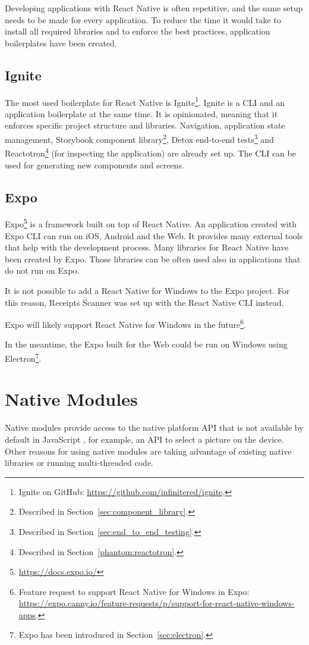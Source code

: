 \documentclass[
  digital, %
  table,   %
  oneside, %
  lof,     %
  lot,     %
]{fithesis3}
\begin{document}
Developing applications with React Native is often repetitive, and the same setup needs to be made for every application. To reduce the time it would take to install all required libraries and to enforce the best practices, application boilerplates have been created.

\subsection{Ignite}
The most used boilerplate for React Native is Ignite\footnote{Ignite on GitHub: \url{https://github.com/infinitered/ignite}.}.
Ignite is a CLI and an application boilerplate at the same time. It is opinionated, meaning that it enforces specific project structure and libraries. Navigation, application state management, Storybook component library\footnote{Described in Section~\ref{sec:component_library}.}, Detox end-to-end tests\footnote{Described in Section~\ref{sec:end_to_end_testing}.} and Reactotron\footnote{Described in Section~\ref{phantom:reactotron}.} (for inspecting the application) are already set up. The CLI can be used for generating new components and screens.

\subsection{Expo}
\label{sec:expo}
Expo\footnote{\url{https://docs.expo.io/}} is a framework built on top of React Native. An application created with Expo CLI can run on iOS, Android and the Web. It provides many external tools that help with the development process. 
Many libraries for React Native have been created by Expo. Those libraries can be often used also in applications that do not run on Expo.

It is not possible to add a React Native for Windows to the Expo project. For this reason, Receipts Scanner was set up with the React Native CLI instead.

Expo will likely support React Native for Windows in the future\footnote{Feature request to support React Native for Windows in Expo: \url{https://expo.canny.io/feature-requests/p/support-for-react-native-windows-apps}.}.

In the meantime, the Expo built for the Web could be run on Windows using Electron\footnote{Expo has been introduced in Section~\ref{sec:electron}.}.

\section{Native Modules}
Native modules provide access to the native platform API that is not available by default in JavaScript \cite{RNNativeModulesIntro}, for example, an API to select a picture on the device. Other reasons for using native modules are taking advantage of existing native libraries or running multi-threaded code.
\end{document}
